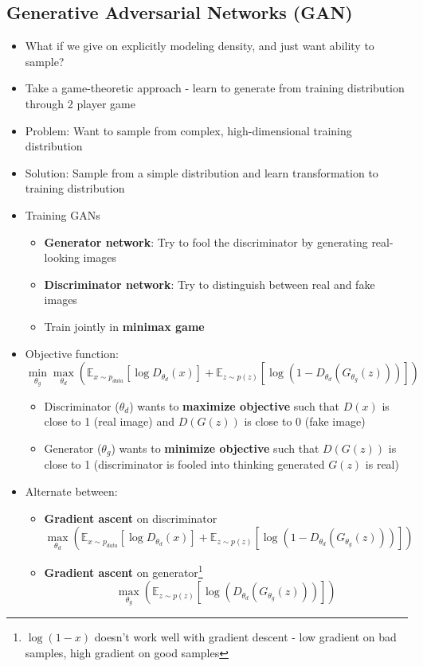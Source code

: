 \subsection{Generative Adversarial Networks (GAN)}
\begin{itemize}
	\item What if we give on explicitly modeling density, and just want ability to sample?
	\item Take a game-theoretic approach - learn to generate from training distribution through 2 player game
	\item Problem: Want to sample from complex, high-dimensional training distribution
	\item Solution: Sample from a simple distribution and learn transformation to training distribution
	\item Training GANs
	\begin{itemize}
		\item \textbf{Generator network}: Try to fool the discriminator by generating real-looking images
		\item \textbf{Discriminator network}: Try to distinguish between real and fake images
		\item Train jointly in \textbf{minimax game}
	\end{itemize}
	\item Objective function:
	$$\min_{\theta_g} \max_{\theta_d}\left( \mathbb{E}_{x\sim p_{data}}\left[\log D_{\theta_d}(x)\right] + \mathbb{E}_{z\sim p(z)} \left[\log(1-D_{\theta_d}(G_{\theta_g}(z)))\right]\right)$$
	\begin{itemize}
		\item Discriminator ($\theta_d$) wants to \textbf{maximize objective} such that $D(x)$ is close to 1 (real image) and $D(G(z))$ is close to 0 (fake image)
		\item Generator ($\theta_g$) wants to \textbf{minimize objective} such that $D(G(z))$ is close to 1 (discriminator is fooled into thinking generated $G(z)$ is real)
	\end{itemize}
	\item Alternate between:
	\begin{itemize}
		\item \textbf{Gradient ascent} on discriminator $$\max_{\theta_d}\left( \mathbb{E}_{x\sim p_{data}}\left[\log D_{\theta_d}(x)\right] + \mathbb{E}_{z\sim p(z)} \left[\log(1-D_{\theta_d}(G_{\theta_g}(z)))\right]\right)$$
		\item \textbf{Gradient ascent} on generator\footnote{$\log(1-x)$ doesn't work well with gradient descent - low gradient on bad samples, high gradient on good samples} $$\max_{\theta_g} \left(\mathbb{E}_{z\sim p(z)} \left[\log(D_{\theta_d}(G_{\theta_g}(z)))\right]\right)$$

\end{itemize}
\end{itemize}
